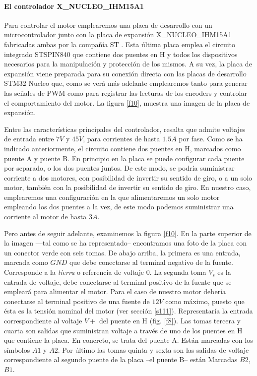 \documentclass[10pt,a4paper]{report}
\begin{document}
\paragraph{El controlador X\_NUCLEO\_IHM15A1} Para controlar el motor emplearemos una placa de desarrollo con un microcontrolador junto con  la placa de expansión X\_NUCLEO\_IHM15A1 fabricadas ambas por la compañía ST \cite{IHM15}. Esta última placa emplea el circuito integrado  STSPIN840  \cite{STSPIN840} que contiene dos puentes en H y todos los dispositivos necesarios para la manipulación y protección de los mismos. A su vez, la placa de expansión viene preparada para su conexión directa con las placas de desarrollo STM32 Nucleo que, como se verá más adelante emplearemos tanto para generar las señales de PWM como para registrar las lecturas de los encoders y controlar el comportamiento del motor. La figura \ref{f10}, muestra una imagen de la placa de expansión. 

Entre las características principales del controlador, resalta que admite voltajes de entrada entre $7V$ y $45V$, para corrientes de hasta $1.5 A$ por fase. Como se ha indicado anteriormente, el circuito contiene dos puentes en H, marcados como puente A y puente B.  En principio en la placa se puede configurar  cada puente por separado, o los dos puentes juntos. De este modo, se podría suministrar corriente a dos motores, con posibilidad de invertir su sentido de giro, o a un solo motor, también con la posibilidad de invertir su sentido de giro. En nuestro caso, emplearemos  una configuración en la que alimentaremos un solo motor empleando los dos puentes a la vez, de este modo podemos suministrar una corriente al motor de hasta $3 A$.  

Pero antes de seguir adelante, examinemos la figura \ref{f10}. En la parte superior de la imagen ---tal como se ha representado-- encontramos una foto de la placa con un conector verde con seis tomas. De abajo arriba, la primera es una entrada, marcada como $GND$ que debe conectarse al terminal negativo de la fuente. Corresponde a la \emph{tierra} o referencia de voltaje $0$. La segunda toma $V_{s}$ es la entrada de voltaje, debe conectarse al terminal positivo de la fuente que se empleará para alimentar el motor. Para el caso de nuestro motor debería conectarse al terminal positivo de una fuente de $12V$ como máximo, puesto que ésta es la tensión nominal del motor (ver sección \ref{s111}). Representaría la entrada correspondiente al voltaje $V+$ del puente en H (fig. \ref{f8}).  Las tomas tercera y cuarta son salidas que suministran voltaje a través de uno de los puentes en H que contiene la placa. En concreto, se trata del puente A. Están marcadas con los símbolos $A1$ y $A2$. Por último las tomas quinta y sexta son las salidas de voltaje correspondiente al segundo puente de la placa --el puente B-- están Marcadas $B2$, $B1$.
\end{document}
